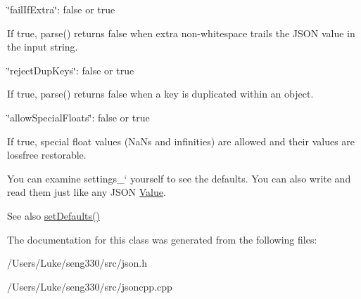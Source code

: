 \begin{DoxyItemize}
\begin{DoxyItemize}
\end{DoxyItemize}
\item {\ttfamily \char`\"{}fail\+If\+Extra\char`\"{}\+: false or true}
\begin{DoxyItemize}
\item If true, {\ttfamily parse()} returns false when extra non-\/whitespace trails the J\+S\+O\+N value in the input string.
\end{DoxyItemize}
\item {\ttfamily \char`\"{}reject\+Dup\+Keys\char`\"{}\+: false or true}
\begin{DoxyItemize}
\item If true, {\ttfamily parse()} returns false when a key is duplicated within an object.
\end{DoxyItemize}
\item {\ttfamily \char`\"{}allow\+Special\+Floats\char`\"{}\+: false or true}
\begin{DoxyItemize}
\item If true, special float values (Na\+Ns and infinities) are allowed and their values are lossfree restorable.
\end{DoxyItemize}
\end{DoxyItemize}

You can examine \textquotesingle{}settings\+\_\+` yourself to see the defaults. You can also write and read them just like any J\+S\+O\+N \hyperlink{class_json_1_1_value}{Value}. \begin{DoxySeeAlso}{See also}
\hyperlink{class_json_1_1_char_reader_builder_a03ff031e06aabff989ab4addc87294ab}{set\+Defaults()} 
\end{DoxySeeAlso}


The documentation for this class was generated from the following files\+:\begin{DoxyCompactItemize}
\item 
/\+Users/\+Luke/seng330/src/json.\+h\item 
/\+Users/\+Luke/seng330/src/jsoncpp.\+cpp\end{DoxyCompactItemize}
